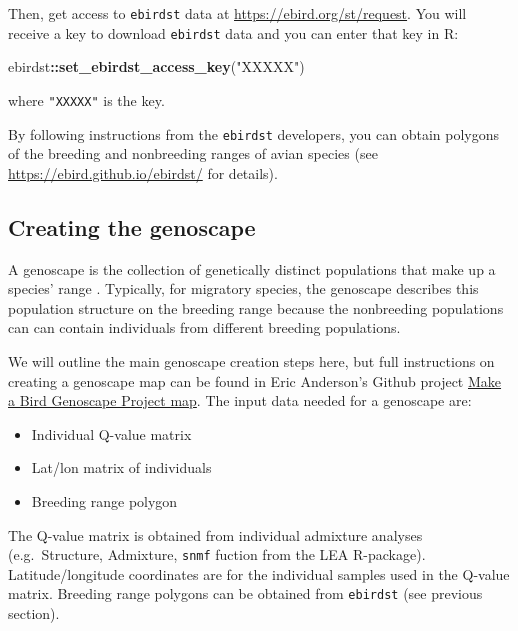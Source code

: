 \documentclass[
]{book}
\newenvironment{Shaded}{\begin{snugshade}}{\end{snugshade}}
\newcommand{\FunctionTok}[1]{\textcolor[rgb]{0.13,0.29,0.53}{\textbf{#1}}}
\newcommand{\NormalTok}[1]{#1}
\newcommand{\SpecialCharTok}[1]{\textcolor[rgb]{0.81,0.36,0.00}{\textbf{#1}}}
\newcommand{\StringTok}[1]{\textcolor[rgb]{0.31,0.60,0.02}{#1}}
\providecommand{\tightlist}{%
  \setlength{\itemsep}{0pt}\setlength{\parskip}{0pt}}
\begin{document}
Then, get access to \texttt{ebirdst} data at \url{https://ebird.org/st/request}. You will receive a key to download \texttt{ebirdst} data and you can enter that key in R:

\begin{Shaded}
\begin{Highlighting}[]
\NormalTok{ebirdst}\SpecialCharTok{::}\FunctionTok{set\_ebirdst\_access\_key}\NormalTok{(}\StringTok{"XXXXX"}\NormalTok{)}
\end{Highlighting}
\end{Shaded}

where \texttt{"XXXXX"} is the key.

By following instructions from the \texttt{ebirdst} developers, you can obtain polygons of the breeding and nonbreeding ranges of avian species (see \url{https://ebird.github.io/ebirdst/} for details).

\hypertarget{creating-the-genoscape}{%
\subsection{Creating the genoscape}\label{creating-the-genoscape}}

A genoscape is the collection of genetically distinct populations that make up a species' range \citep{ruegg2021american}. Typically, for migratory species, the genoscape describes this population structure on the breeding range because the nonbreeding populations can can contain individuals from different breeding populations.

We will outline the main genoscape creation steps here, but full instructions on creating a genoscape map can be found in Eric Anderson's Github project \href{https://github.com/eriqande/make-a-BGP-map}{Make a Bird Genoscape Project map}. The input data needed for a genoscape are:

\begin{itemize}
\tightlist
\item
  Individual Q-value matrix
\item
  Lat/lon matrix of individuals
\item
  Breeding range polygon
\end{itemize}

The Q-value matrix is obtained from individual admixture analyses (e.g.~Structure, Admixture, \texttt{snmf} fuction from the LEA R-package). Latitude/longitude coordinates are for the individual samples used in the Q-value matrix. Breeding range polygons can be obtained from \texttt{ebirdst} (see previous section).
\end{document}
